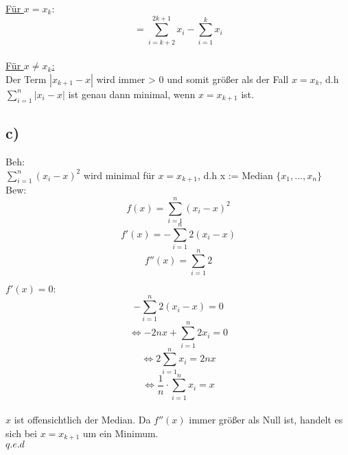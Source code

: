 \documentclass[a4paper,11pt,twoside]{article}
\begin{document}
\underline{Für $x=x_k$}:
\[= \sum_{i=k+2}^{2k+1}x_i - \sum_{i=1}^{k}x_i \] \\

\underline{Für $x \neq x_k$:}\\
Der Term  $|x_{k+1}-x|$ wird immer > 0 und somit größer als der Fall $x=x_k$, d.h  $\sum_{i=1}^{n} |x_i-x|$ ist genau dann minimal, wenn $x = x_{k+1}$ ist.

\subsection*{c)}

Beh:\\ $\sum_{i=1}^{n} (x_i-x)^2$ wird minimal für $x = x_{k+1}$, d.h x := Median $\{x_1, ..., x_n\}$\\

Bew: \\
\[f(x) = \sum_{i=1}^{n} (x_i -x)^2\]
\[f'(x) = -\sum_{i=1}^{n} 2(x_i -x)\]
\[f''(x) = \sum_{i=1}^{n} 2\]

\underline{$f'(x)=0:$}\\
\[-\sum_{i=1}^{n}2(x_i -x) = 0\]
\[\Leftrightarrow -2nx + \sum_{i=1}^{n}2x_i = 0\]
\[\Leftrightarrow 2\sum_{i=1}^{n}x_i = 2nx\]
\[\Leftrightarrow \frac{1}{n} \cdot \sum_{i=1}^{n}x_i = x\]\\

$x$ ist offensichtlich der Median. Da $f''(x)$ immer größer als Null ist, handelt es sich bei $x=x_{k+1}$ um ein Minimum.\\
$q.e.d$
\end{document}
